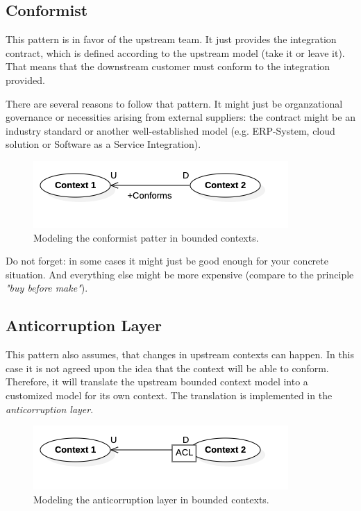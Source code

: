 \documentclass{tufte-handout}
\begin{document}
\subsection{Conformist}

This pattern is in favor of the upstream team. It just provides the integration contract,
which is defined according to the upstream model (take it or leave it). That means that
the downstream customer must conform to the integration provided.

There are several reasons to follow that pattern. It might just be organzational governance
or necessities arising from external suppliers: the contract might be an industry standard
or another well-established model (e.g. ERP-System, cloud solution or Software as a Service
Integration).

\begin{figure}
    \includegraphics[width=.8\textwidth]{img/conforms.png}
    \caption{Modeling the conformist patter in bounded contexts.}
\end{figure}

Do not forget: in some cases it might just be good enough for your concrete situation. And 
everything else might be more expensive (compare to the principle \textit{"buy before make"}).

\subsection{Anticorruption Layer}

This pattern also assumes, that changes in upstream contexts can happen. In this case it
is not agreed upon the idea that the context will be able to conform. Therefore, it will
translate the upstream bounded context model into a customized model for its own context.
The translation is implemented in the \textit{anticorruption layer}.

\begin{figure}
    \includegraphics[width=.8\textwidth]{img/anticorruption.png}
    \caption{Modeling the anticorruption layer in bounded contexts.}
\end{figure}
\end{document}
